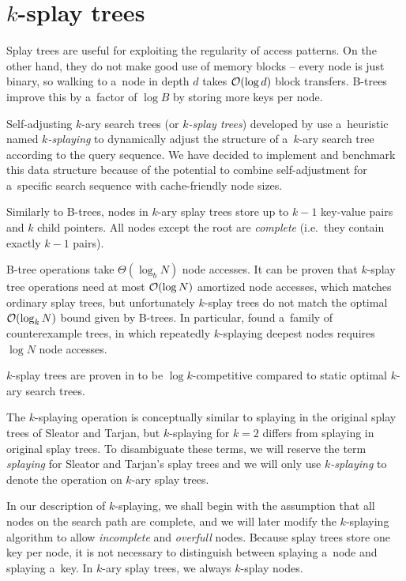 \chapter{$k$-splay trees}
\label{chapter:ksplay}
Splay trees are useful for exploiting the regularity of access patterns.
On the other hand, they do not make good use of memory blocks -- every node
is just binary, so walking to a~node in depth $d$ takes $\mathcal{O}(\log d)$ block
transfers. B-trees improve this by a~factor of $\log B$ by storing more keys
per node.

Self-adjusting $k$-ary search trees (or \emph{$k$-splay trees}) developed
by \cite{ksplay-sherk} use a~heuristic named \emph{$k$-splaying}
to dynamically adjust the structure of a~$k$-ary search tree according to
the query sequence. We have decided to implement and benchmark this data
structure because of the potential to combine self-adjustment for a~specific
search sequence with cache-friendly node sizes.

Similarly to B-trees, nodes in $k$-ary splay trees store up to $k-1$ key-value
pairs and $k$ child pointers. All nodes except the root are \emph{complete}
(i.e.\ they contain exactly $k-1$ pairs).

\mbox{B-tree} operations take $\Theta(\log_b N)$ node accesses. It can be
proven that \mbox{$k$-splay} tree operations need at most $\mathcal{O}(\log N)$
amortized node accesses, which matches ordinary splay trees, but unfortunately
$k$-splay trees do not match the optimal $\mathcal{O}(\log_k N)$ bound given by B-trees.
In particular, \cite{ksplay-nonopt} found a~family of counterexample trees,
in which repeatedly $k$-splaying deepest nodes requires $\log N$ node accesses.

$k$-splay trees are proven in \cite{ksplay-sherk} to be $\log k$-competitive
compared to static optimal $k$-ary search trees.

The $k$-splaying operation is conceptually similar to splaying in the original
splay trees of Sleator and Tarjan, but $k$-splaying for $k=2$ differs from
splaying in original splay trees. To disambiguate these terms, we will
reserve the term \emph{splaying} for Sleator and Tarjan's splay trees and
we will only use \emph{$k$-splaying} to denote the operation
on $k$-ary splay trees.

In our description of $k$-splaying, we shall begin with the assumption that
all nodes on the search path are complete, and we will later modify
the $k$-splaying algorithm to allow \emph{incomplete} and \emph{overfull}
nodes.
Because splay trees store one key per node, it is not necessary to distinguish
between splaying a~node and splaying a~key. In $k$-ary splay trees, we always
$k$-splay nodes.

